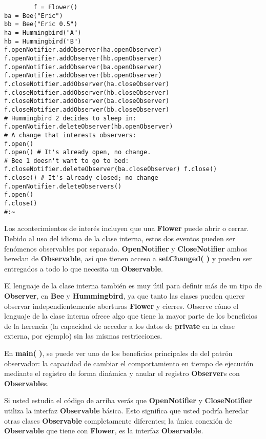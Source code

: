 \begin{lstlisting}
        f = Flower() 
ba = Bee("Eric") 
bb = Bee("Eric 0.5") 
ha = Hummingbird("A") 
hb = Hummingbird("B") 
f.openNotifier.addObserver(ha.openObserver) 
f.openNotifier.addObserver(hb.openObserver) 
f.openNotifier.addObserver(ba.openObserver) 
f.openNotifier.addObserver(bb.openObserver) 
f.closeNotifier.addObserver(ha.closeObserver) 
f.closeNotifier.addObserver(hb.closeObserver) 
f.closeNotifier.addObserver(ba.closeObserver) 
f.closeNotifier.addObserver(bb.closeObserver) 
# Hummingbird 2 decides to sleep in: 
f.openNotifier.deleteObserver(hb.openObserver) 
# A change that interests observers: 
f.open() 
f.open() # It's already open, no change. 
# Bee 1 doesn't want to go to bed: 
f.closeNotifier.deleteObserver(ba.closeObserver) f.close() 
f.close() # It's already closed; no change 
f.openNotifier.deleteObservers() 
f.open() 
f.close() 
#:~ 
\end{lstlisting}

Los acontecimientos de interés incluyen que una \textbf{Flower} puede abrir o cerrar. Debido al uso del idioma de la clase interna, estos dos eventos pueden ser fenómenos observables por separado. \textbf{OpenNotifier} y \textbf{CloseNotifier} ambos heredan de \textbf{Observable}, así que tienen acceso a \textbf{setChanged( )} y pueden ser entregados a todo lo que necesita un \textbf{Observable}. \newline

El lenguaje de la clase interna también es muy útil para definir más de un tipo de \textbf{Observer}, en \textbf{Bee} y \textbf{Hummingbird}, ya que tanto las clases pueden querer observar independientemente aberturas \textbf{Flower} y cierres. Observe cómo el lenguaje de la clase interna ofrece algo que tiene la mayor parte de los beneficios de la herencia (la capacidad de acceder a los datos de \textbf{private} en la clase externa, por ejemplo) sin las mismas restricciones.  \newline

En \textbf{main( )}, se puede ver uno de los beneficios principales de del patrón observador: la capacidad de cambiar el comportamiento en tiempo de ejecución mediante el registro de forma dinámica y anular el registro \textbf{Observer}s con \textbf{Observable}s.    \newline

Si usted estudia el código de arriba verás que \textbf{OpenNotifier} y \textbf{CloseNotifier} utiliza la interfaz \textbf{Observable} básica. Esto significa que usted podría heredar otras clases \textbf{Observable} completamente diferentes; la única conexión de \textbf{Observable} que tiene con \textbf{Flower}, es la interfaz \textbf{Observable}.    \newline

